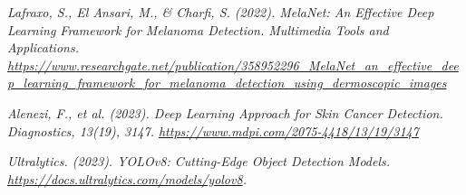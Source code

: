 \documentclass[a4paper,12pt]{report}
\begin{document}
\begin{spacing}{1.5}
\begin{thebibliography}{99}
 \emph{Lafraxo, S., El Ansari, M., \& Charfi, S. (2022). MelaNet: An Effective Deep Learning Framework for Melanoma Detection. Multimedia Tools and Applications. \url{https://www.researchgate.net/publication/358952296_MelaNet_an_effective_deep_learning_framework_for_melanoma_detection_using_dermoscopic_images}}

 \emph{Alenezi, F., et al. (2023). Deep Learning Approach for Skin Cancer Detection. Diagnostics, 13(19), 3147. \url{https://www.mdpi.com/2075-4418/13/19/3147}}



 \emph{Ultralytics. (2023). YOLOv8: Cutting-Edge Object Detection Models. \url{https://docs.ultralytics.com/models/yolov8}.}




\end{thebibliography}

\end{spacing}
\end{document}
